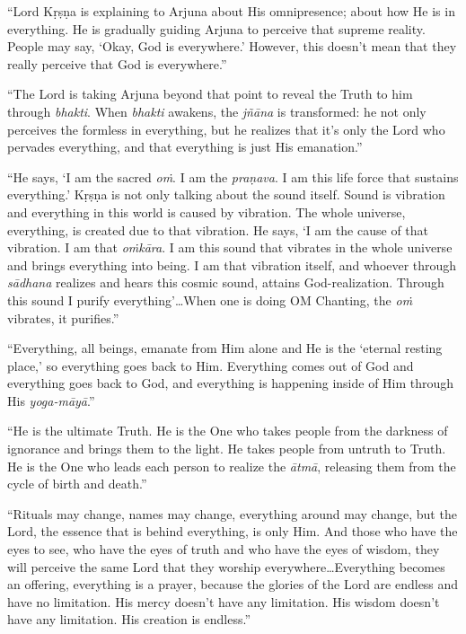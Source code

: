 \enquote{Lord Kṛṣṇa is explaining to Arjuna about His omnipresence; about how He is in everything. He is gradually guiding Arjuna to perceive that supreme reality. People may say, \enquote{Okay, God is everywhere.} However, this doesn’t mean that they really perceive that God is everywhere.}

\enquote{The Lord is taking Arjuna beyond that point to reveal the Truth to him through \textit{bhakti}. When \textit{bhakti} awakens, the \textit{jñāna} is transformed: he not only perceives the formless in everything, but he realizes that it’s only the Lord who pervades everything, and that everything is just His emanation.}

\enquote{He says, \enquote{I am the sacred \textit{oṁ}. I am the \textit{praṇava}. I am this life force that sustains everything.} Kṛṣṇa is not only talking about the sound itself. Sound is vibration and everything in this world is caused by vibration. The whole universe, everything, is created due to that vibration. He says, \enquote{I am the cause of that vibration. I am that \textit{oṁkāra}. I am this sound that vibrates in the whole universe and brings everything into being. I am that vibration itself, and whoever through \textit{sādhana} realizes and hears this cosmic sound, attains God-realization. Through this sound I purify everything}\ldots When one is doing OM Chanting, the \textit{oṁ} vibrates, it purifies.}

\enquote{Everything, all beings, emanate from Him alone and He is the \enquote{eternal resting place,} so everything goes back to Him. Everything comes out of God and everything goes back to God, and everything is happening inside of Him through His \textit{yoga-māyā}.}

\enquote{He is the ultimate Truth. He is the One who takes people from the darkness of ignorance and brings them to the light. He takes people from untruth to Truth. He is the One who leads each person to realize the \textit{ātmā}, releasing them from the cycle of birth and death.}

\enquote{Rituals may change, names may change, everything around may change, but the Lord, the essence that is behind everything, is only Him. And those who have the eyes to see, who have the eyes of truth and who have the eyes of wisdom, they will perceive the same Lord that they worship everywhere\ldots Everything becomes an offering, everything is a prayer, because the glories of the Lord are endless and have no limitation. His mercy doesn’t have any limitation. His wisdom doesn’t have any limitation. His creation is endless.}

